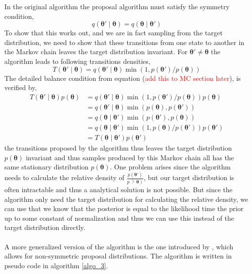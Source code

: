In the original algorithm the proposal algorithm must satisfy the symmetry condition,
\begin{equation*}
    q(\boldsymbol{\theta'}\mid \boldsymbol{\theta})=q(\boldsymbol{\theta}\mid \boldsymbol{\theta'})
\end{equation*}
To show that this works out, and we are in fact sampling from the target distribution, we need to show that these transitions from one state to another in the Markov chain leaves the target distribution invariant. For $\boldsymbol{\theta'}\neq \boldsymbol{\theta}$ the algorithm leads to following transitions densities,
\begin{equation*}
    T\left(\boldsymbol{\theta}' \mid \boldsymbol{\theta}\right)=q\left(\boldsymbol{\theta}' \mid \boldsymbol{\theta}\right) \min \left(1, p\left(\boldsymbol{\theta}'\right) / p(\boldsymbol{\theta})\right)
\end{equation*}
The detailed balance condition from equation (\textcolor{red}{add this to MC section later}), is verified by,
\begin{equation*}
\begin{aligned}
T\left(\boldsymbol{\theta}' \mid \boldsymbol{\theta}\right) p(\boldsymbol{\theta}) &=q\left(\boldsymbol{\theta}' \mid \boldsymbol{\theta}\right) \min \left(1, p\left(\boldsymbol{\theta}'\right) / p(\boldsymbol{\theta})\right) p(\boldsymbol{\theta}) \\
&=q\left(\boldsymbol{\theta}' \mid \boldsymbol{\theta}\right) \min \left(p(\boldsymbol{\theta}), p\left(\boldsymbol{\theta}'\right)\right) \\
&=q\left(\boldsymbol{\theta} \mid \boldsymbol{\theta}'\right) \min \left(p\left(\boldsymbol{\theta}'\right), p(\boldsymbol{\theta})\right) \\
&=q\left(\boldsymbol{\theta} \mid \boldsymbol{\theta}'\right) \min \left(1, p(\boldsymbol{\theta}) / p\left(\boldsymbol{\theta}'\right)\right) p\left(\boldsymbol{\theta}'\right) \\
&=T\left(\boldsymbol{\theta} \mid \boldsymbol{\theta}'\right) p\left(\boldsymbol{\theta}'\right)
\end{aligned}
\end{equation*}
the transitions proposed by the algorithm thus leaves the target distribution $p(\boldsymbol{\theta})$ invariant and thus samples produced by this Markov chain all has the same stationary distribution $p(\boldsymbol{\theta})$. One problem arises since the algorithm needs to calculate the relative density of $\frac{p(\boldsymbol{\theta'})}{p\left)\boldsymbol{\theta}\right)}$, but our target distribution is often intractable and thus a analytical solution is not possible. But since the algorithm only need the target distribution for calculating the relative density, we can use that we know that the posterior is equal to the likelihood time the prior up to some constant of normalization and thus we can use this instead of the target distribution directly.\\
\\
A more generalized version of the algorithm is the one introduced by \cite{hastings70}, which allows for non-symmetric proposal distributions. The algorithm is written in pseudo code in algorithm \ref{algo_3}.

